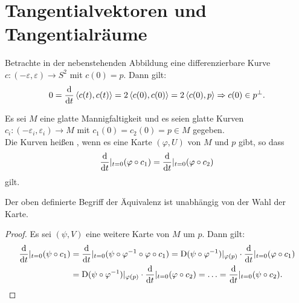 
\section{Tangentialvektoren und Tangentialräume}


Betrachte in der nebenstehenden Abbildung eine differenzierbare Kurve $c \colon (-\varepsilon,\varepsilon) \to S^2$ mit $c(0) = p$. Dann gilt:
\begin{align*}
  0 = \dfrac{\mathrm{d} }{\mathrm{d} t} \left<c(t),c(t)\right> = 2\left<c(0),c(0)\right> = 2 \left<c(0),p\right> 
  \Rightarrow c(0) \in p^{\perp}.
\end{align*}


Es sei $M$ eine glatte Mannigfaltigkeit und es seien glatte Kurven $c_i\colon (-\varepsilon_i,\varepsilon_i) \to M$ mit $c_1(0) = c_2(0) = p \in M$ gegeben.\\

Die Kurven heißen , wenn es eine Karte $(\varphi,U)$ von $M$ und $p$ gibt, so dass 
\begin{align*}
  \dfrac{\mathrm{d} }{\mathrm{d} t}|_{t=0}(\varphi \circ c_1) = \dfrac{\mathrm{d} }{\mathrm{d} t}|_{t=0}(\varphi \circ c_2)
\end{align*}
gilt.

\begin{lemma}
  Der oben definierte Begriff der Äquivalenz ist unabhängig von der Wahl der Karte.
\end{lemma}

\begin{proof}
  Es sei $(\psi,V)$ eine weitere Karte von $M$ um $p$. Dann gilt:
  \begin{align*}
    \dfrac{\mathrm{d} }{\mathrm{d} t}|_{t=0}(\psi\circ c_1) & = \dfrac{\mathrm{d} }{\mathrm{d} t}|_{t=0}(\psi\circ\varphi^{-1}\circ\varphi \circ c_1) = \operatorname{D} (\psi \circ \varphi^{-1})|_{\varphi(p)} \cdot \dfrac{\mathrm{d} }{\mathrm{d} t}|_{t=0}(\varphi \circ c_1)\\
    & = \operatorname{D}(\psi \circ \varphi^{-1})|_{\varphi(p)} \cdot \dfrac{\mathrm{d} }{\mathrm{d} t}|_{t=0}(\varphi \circ c_2) = \ldots = \dfrac{\mathrm{d} }{\mathrm{d} t}|_{t=0}(\psi \circ c_2).
  \end{align*}
\end{proof}

